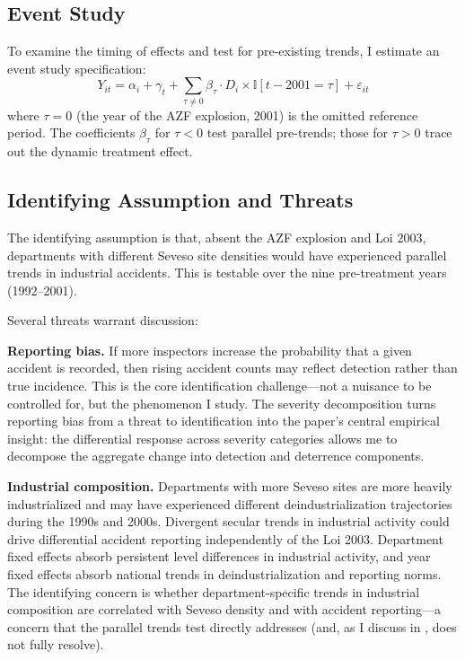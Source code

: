 \documentclass[12pt]{article}
\newcommand{\ind}{\mathbb{I}}
\begin{document}
\subsection{Event Study}

To examine the timing of effects and test for pre-existing trends, I estimate an event study specification:
\begin{equation}
Y_{it} = \alpha_i + \gamma_t + \sum_{\tau \neq 0} \beta_\tau \cdot D_i \times \ind[t - 2001 = \tau] + \varepsilon_{it}
\label{eq:eventstudy}
\end{equation}
where $\tau = 0$ (the year of the AZF explosion, 2001) is the omitted reference period. The coefficients $\beta_\tau$ for $\tau < 0$ test parallel pre-trends; those for $\tau > 0$ trace out the dynamic treatment effect.

\subsection{Identifying Assumption and Threats}

The identifying assumption is that, absent the AZF explosion and Loi 2003, departments with different Seveso site densities would have experienced parallel trends in industrial accidents. This is testable over the nine pre-treatment years (1992--2001).

Several threats warrant discussion:

\textbf{Reporting bias.} If more inspectors increase the probability that a given accident is recorded, then rising accident counts may reflect detection rather than true incidence. This is the core identification challenge---not a nuisance to be controlled for, but the phenomenon I study. The severity decomposition turns reporting bias from a threat to identification into the paper's central empirical insight: the differential response across severity categories allows me to decompose the aggregate change into detection and deterrence components.

\textbf{Industrial composition.} Departments with more Seveso sites are more heavily industrialized and may have experienced different deindustrialization trajectories during the 1990s and 2000s. Divergent secular trends in industrial activity could drive differential accident reporting independently of the Loi 2003. Department fixed effects absorb persistent level differences in industrial activity, and year fixed effects absorb national trends in deindustrialization and reporting norms. The identifying concern is whether department-specific trends in industrial composition are correlated with Seveso density and with accident reporting---a concern that the parallel trends test directly addresses (and, as I discuss in , does not fully resolve).
\end{document}
